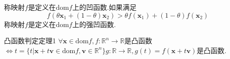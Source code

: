 称映射$f$是定义在$\mathrm{dom} f$上的凹函数.如果满足
\begin{equation}
f(\theta\boldsymbol{x}_1+(1-\theta)\boldsymbol{x}_2)>\theta f(\boldsymbol{x}_1) + (1-\theta)f(\boldsymbol{x}_2)~
\end{equation}
称映射$f$是定义在$\mathrm{dom} f$上的强凹函数.
\begin{theorem}{凸函数判定定理1}
$\forall \boldsymbol{x}\in\mathrm{dom} f,f:\mathbb{R}^n\to\mathbb{R}$是凸函数$\Longleftrightarrow t=\{t|\boldsymbol{x}+t\boldsymbol{v}\in\mathrm{dom} f,\boldsymbol{v}\in\mathbb{R}^n\}g:\mathbb{R}\to\mathbb{R},g(t)=f(\boldsymbol{x}+t\boldsymbol{v})$是凸函数.
\end{theorem}